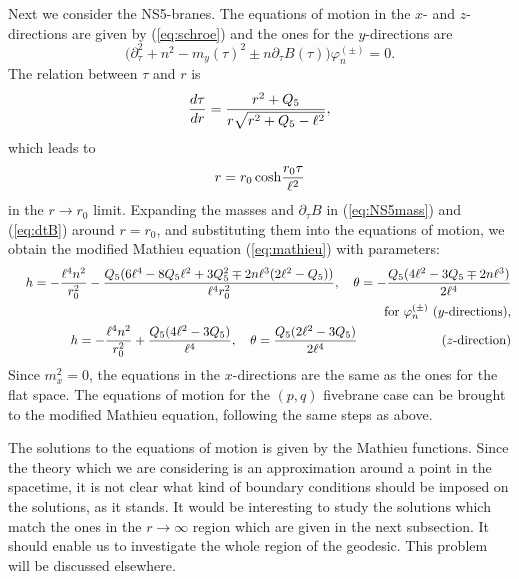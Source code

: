 \documentclass[a4paper,12pt]{article}
\begin{document}
Next we consider the NS5-branes. The equations of motion
in the $x$- and $z$-directions are given by (\ref{eq:schroe})
and the ones for the $y$-directions are 
\begin{equation}
\Big( \partial^2_\tau +n^2 -m_{y}(\tau)^2
\pm n \partial_\tau B(\tau) \Big) \varphi^{(\pm)}_{n}=0.
\label{eq:eomB5}
\end{equation} 
The relation between $\tau$ and $r$ is 
\begin{equation}
 {d\tau\over dr}={r^2+Q_{5}\over r\sqrt{r^2+Q_{5}-\ell^2}},
\end{equation}
which leads to 
\begin{equation}
r=r_{0}\,{\rm cosh }{r_{0}\tau\over \ell^{2}}
\label{eq:trNS5CR}
\end{equation}
in the $r\rightarrow r_{0}$ limit.
Expanding the masses and $\partial_{\tau}B$ in 
(\ref{eq:NS5mass}) and (\ref{eq:dtB}) around $r=r_{0}$, 
and substituting them into the equations of motion,
we obtain the modified Mathieu equation (\ref{eq:mathieu})
with parameters:
\begin{eqnarray}
&&h=-{\ell^{4} n^{2}\over r_{0}^2}
-{Q_{5} (6\ell^{4}-8Q_{5}\ell^{2} 
+3 Q_{5}^{2}\mp 2n\ell^3(2\ell^2-Q_{5}))
\over \ell^4 r_{0}^2},\quad 
\theta=-{Q_{5}(4\ell^{2}-3 Q_{5}\mp2n\ell^3)
\over 2 \ell^{4}}\nonumber\\
&&\hspace*{10cm}\mbox{for }\varphi^{(\pm)}_{n}
\mbox{ ($y$-directions),}
\nonumber\\
&&h=-{\ell^{4} n^{2}\over r_{0}^2} 
+{Q_{5} (4\ell^{2}-3 Q_{5})\over \ell^{4}},\quad 
\theta={Q_{5}(2\ell^{2}-3 Q_{5})\over 2 \ell^{4}}
\qquad\hspace{1.5cm}\,\,\mbox{($z$-direction)}
\end{eqnarray}
Since $m^{2}_{x}=0$, the equations in the $x$-directions
are the same as the ones for the flat space.
The equations of motion for the $(p,q)$ fivebrane case
can be brought to the modified Mathieu equation,
following the same steps as above.

The solutions to the equations of motion is given by
the Mathieu functions. 
Since the theory which we are considering is an
approximation around a point in the spacetime,
it is not clear what kind of boundary conditions
should be imposed on the solutions, as it stands.
It would be interesting to study the solutions which
match the ones in the $r\rightarrow\infty$ region which are
given in the next subsection. It should enable us to
investigate the whole region of the geodesic. 
This problem will be discussed elsewhere. 
\end{document}
